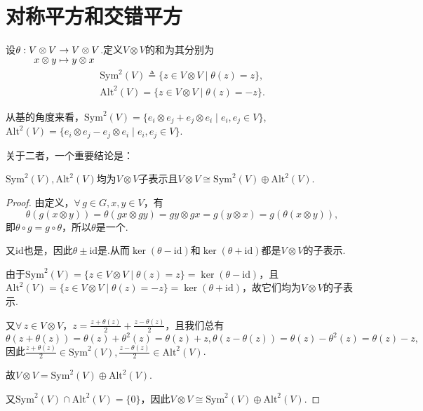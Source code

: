 \section{对称平方和交错平方}

\begin{definition}
    设$\setjot[-2]\begin{aligned}[t]
        \theta: V\otimes V&\to V\otimes V\\
        x\otimes y&\mapsto y\otimes x
    \end{aligned} $.定义$V\otimes V$的和为其分别为
    \begin{gather*}
        \mathrm{Sym}^2(V)\triangleq\{z\in V\otimes V\mid\theta(z)=z\},\\
        \mathrm{Alt}^2(V)=\{z\in V\otimes V\mid\theta(z)=-z\}.
    \end{gather*}
\end{definition}

从基的角度来看，$\mathrm{Sym}^2(V)=\{e_i\otimes e_j+e_j\otimes e_i\mid e_i,e_j\in V\}$, $\mathrm{Alt}^2(V)=\{e_i\otimes e_j-e_j\otimes e_i\mid e_i,e_j\in V\}$.\par

关于二者，一个重要结论是：
\begin{theorem}[]
    $\mathrm{Sym}^2(V),\mathrm{Alt}^2(V)$均为$V\otimes V$子表示且$V\otimes V\cong\mathrm{Sym}^2(V)\oplus\mathrm{Alt}^2(V)$.
\end{theorem}

\begin{proof}
    由定义，$\forall\,g\in G,x,y\in V$，有
    \begin{equation*}
        \theta(g(x\otimes y))=\theta(gx\otimes gy)=gy\otimes gx=g(y\otimes x)=g(\theta(x\otimes y)),
    \end{equation*}
    即$\theta\circ g=g\circ \theta$，所以$\theta$是一个\ghomo.\par
    又$\mathrm{id}$也是\ghomo ，因此$\theta\pm\mathrm{id}$是\ghomo.从而$\ker(\theta-\mathrm{id})$和$\ker(\theta+\mathrm{id})$都是$V\otimes V$的子表示.\par 
    由于$\mathrm{Sym}^2(V)=\{z\in V\otimes V\mid \theta(z)=z\}=\ker(\theta-\mathrm{id})$，且$\mathrm{Alt}^2(V)=\{z\in V\otimes V\mid \theta(z)=-z\}=\ker(\theta+\mathrm{id})$，故它们均为$V\otimes V$的子表示.\par 
    又$\forall\,z\in V\otimes V$，$z=\frac{z+\theta(z)}{2}+\frac{z-\theta(z)}{2}$，且我们总有
    \begin{equation*}\theta(z+\theta(z))=\theta(z)+\theta^2(z)=\theta(z)+z,\theta(z-\theta(z))=\theta(z)-\theta^2(z)=\theta(z)-z,
    \end{equation*}
    因此$\frac{z+\theta(z)}{2}\in\mathrm{Sym}^2(V),\frac{z-\theta(z)}{2}\in\mathrm{Alt}^2(V)$.\par
    故$V\otimes V=\mathrm{Sym}^2(V)\oplus\mathrm{Alt}^2(V)$.\par
    又$\mathrm{Sym}^2(V)\cap \mathrm{Alt}^2(V)=\{0\}$，因此$V\otimes V\cong\mathrm{Sym}^2(V)\oplus\mathrm{Alt}^2(V)$.
\end{proof}


